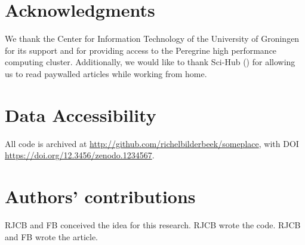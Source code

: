 
\section{Acknowledgments}

We thank the Center for Information Technology of the University 
of Groningen for its support and for providing access to the Peregrine 
high performance computing cluster. 
Additionally, we would like to thank Sci-Hub (\cite{himmelstein2018sci})
for allowing us to read paywalled articles while working from home.

\section{Data Accessibility}

All code is archived at \url{http://github.com/richelbilderbeek/someplace},
with DOI \url{https://doi.org/12.3456/zenodo.1234567}.

\section{Authors' contributions}

RJCB and FB conceived the idea for this research. 
RJCB wrote the code.
RJCB and FB wrote the article.





\appendix
